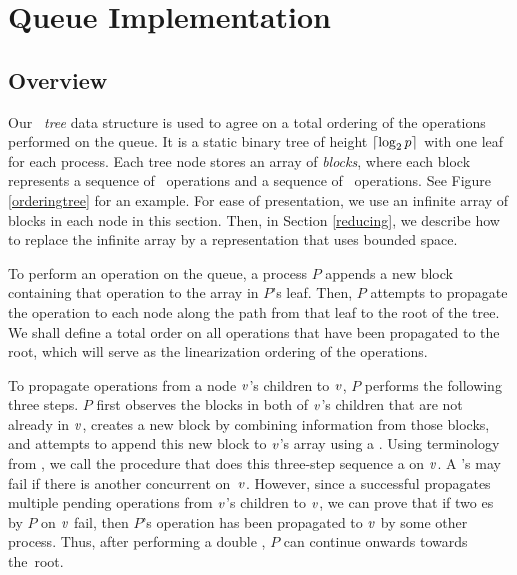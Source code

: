 
\section{Queue Implementation} \label{DescriptQ}

\subsection{Overview}
Our \emph{\ordering\ tree} data structure is used to agree on a total ordering of the operations performed on the queue.
It is a static binary tree of height $\lceil \log_2 p \rceil$ with one leaf 
for each process. 
Each tree node  stores an array of \emph{blocks}, where each block represents a 
sequence of \enqueue\ operations and a sequence of \dequeue\ operations.
See Figure \ref{orderingtree} for an example.
For ease of presentation,
we use an infinite array of blocks in each node in this section.
Then, in Section \ref{reducing}, we describe how to replace the infinite array by a representation that uses bounded space.

To perform an operation on the queue, a process $P$ appends a new block containing that  
operation to the  array in $P$'s leaf.
Then, $P$ attempts to propagate the operation to each node along the path from that leaf to the root of the tree.
We shall define a total order on all operations that have been propagated to the root, which 
will serve as the linearization ordering of the operations.

To propagate operations from a node $\mbox{\textnormal{\textit{v}}}$'s children to $\mbox{\textnormal{\textit{v}}}$, $P$ performs the following
three steps.
$P$ first observes
the blocks in both of $\mbox{\textnormal{\textit{v}}}$'s children that are not already in $\mbox{\textnormal{\textit{v}}}$,
creates a new block by combining information from those blocks, and attempts to append this 
new block to $\mbox{\textnormal{\textit{v}}}$'s  array using a .
Using terminology from \cite{DBLP:conf/fsttcs/JayantiP05}, we call the procedure that does this three-step sequence a
 on $\mbox{\textnormal{\textit{v}}}$. %
A 's  may fail if there is another concurrent  on~$\mbox{\textnormal{\textit{v}}}$.
However, since a successful  propagates multiple pending operations 
from $\mbox{\textnormal{\textit{v}}}$'s children to $\mbox{\textnormal{\textit{v}}}$,
we can prove that if two es by $P$ on $\mbox{\textnormal{\textit{v}}}$ fail,
then $P$'s operation has been propagated to $\mbox{\textnormal{\textit{v}}}$ by some other process.
Thus, after performing a double , $P$ can continue 
onwards towards the~root.

